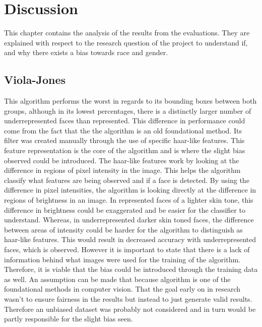 \documentclass{l4proj}
\begin{document}
\chapter{Discussion}
This chapter contains the analysis of the results from the evaluations. They are explained with respect to the research question of the project to understand if, and why there exists a bias towards race and gender. 
\section{Viola-Jones}
This algorithm performs the worst in regards to its bounding boxes between both groups, although in its lowest percentages, there is a distinctly larger number of underrepresented faces than represented. This difference in performance could come from the fact that the the algorithm is an old foundational method. Its filter was created manually through the use of specific haar-like features. This feature representation is the core of the algorithm and is where the slight bias observed could be introduced. The haar-like features work by looking at the difference in regions of pixel intensity in the image. This helps the algorithm classify what features are being observed and if a face is detected. By using the difference in pixel intensities, the algorithm is looking directly at the difference in regions of brightness in an image. In represented faces of a lighter skin tone, this difference in brightness could be exaggerated and be easier for the classifier to understand. Whereas, in underrepresented darker skin toned faces, the difference between areas of intensity could be harder for the algorithm to distinguish as haar-like features. This would result in decreased accuracy with underrepresented faces, which is observed. However it is important to state that there is a lack of information behind what images were used for the training of the algorithm. Therefore, it is viable that the bias could be introduced through the training data as well. An assumption can be made that because algorithm is one of the foundational methods in computer vision. That the goal early on in research wasn't to ensure fairness in the results but instead to just generate valid results. Therefore an unbiased dataset was probably not considered and in turn would be partly responsible for the slight bias seen.

\end{document}

